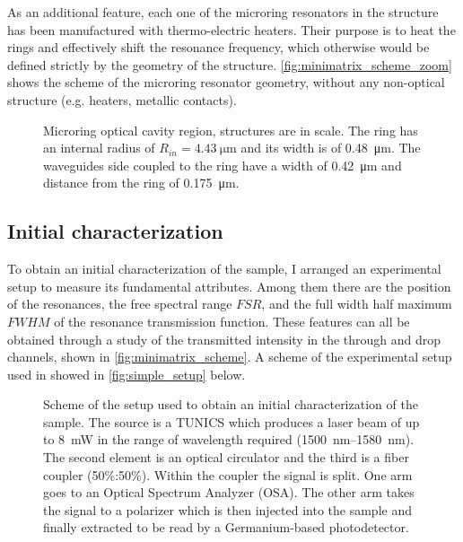 As an additional feature, each one of the microring resonators in the structure has been manufactured with thermo-electric heaters.
Their purpose \cite{testa2016design} is to heat the rings and effectively shift the resonance frequency, which otherwise would be defined strictly by the geometry of the structure.
\autoref{fig:minimatrix_scheme_zoom} shows the scheme of the microring resonator geometry, without any non-optical structure (e.g. heaters, metallic contacts).

\begin{figure}[htbp]
	\centering
	
	\caption{
	Microring optical cavity region, structures are in scale.
	The ring has an internal radius of $R_{in}=\SI{4.43}{\um}$ and its width is of \SI{0.48}{\um}.
	The waveguides side coupled to the ring have a width of \SI{0.42}{\um} and distance from the ring of \SI{.175}{\um}.
	}
	\label{fig:minimatrix_scheme_zoom}
\end{figure}

\subsection{Initial characterization}
\label{ssec:initial_characterization}
To obtain an initial characterization of the sample, I arranged an experimental setup to measure its fundamental attributes.
Among them there are the position of the resonances, the free spectral range $FSR$, and the full width half maximum $FWHM$ of the resonance transmission function.
These features can all be obtained through a study of the transmitted intensity in the through and drop channels, shown in \autoref{fig:minimatrix_scheme}.
A scheme of the experimental setup used in showed in \autoref{fig:simple_setup} below.

\begin{figure}
	\centering
	
	\caption{Scheme of the setup used to obtain an initial characterization of the sample.
		The source is a TUNICS which produces a laser beam of up to \SI{8}{\mW} in the range of wavelength required (\SIrange{1500}{1580}{\nm}).
		The second element is an optical circulator and the third is a fiber coupler (50\%:50\%).
		Within the coupler the signal is split. One arm goes to an Optical Spectrum Analyzer (OSA).
		The other arm takes the signal to a polarizer which is then injected into the sample and finally extracted to be read by a Germanium-based photodetector.
		}
	\label{fig:simple_setup}
\end{figure}

